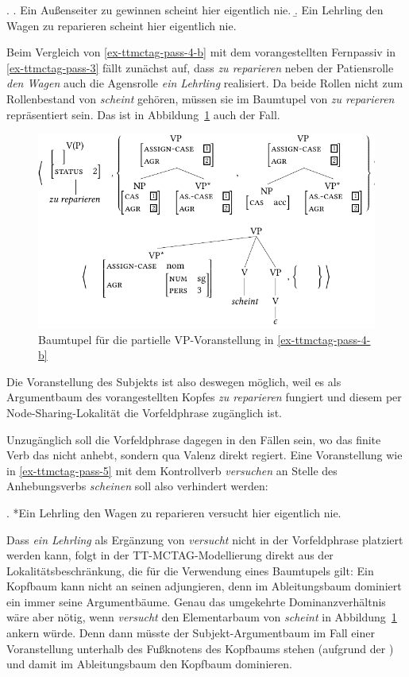 \ex. \label{ex-ttmctag-pass-4} 
\a. \label{ex-ttmctag-pass-4-a} Ein Au\ss enseiter zu gewinnen scheint hier eigentlich nie. \hfill \cite[(265)]{Meurers:99}
\b. \label{ex-ttmctag-pass-4-b} Ein Lehrling den Wagen zu reparieren scheint hier eigentlich nie.

Beim Vergleich von \ref{ex-ttmctag-pass-4-b} mit dem vorangestellten Fernpassiv in \ref{ex-ttmctag-pass-3} fällt zunächst auf, dass {\it zu reparieren} neben der Patiensrolle {\it den Wagen} auch die Agensrolle {\it ein Lehrling} realisiert. Da beide Rollen nicht zum Rollenbestand von {\it scheint} gehören, müssen sie im Baumtupel von {\it zu reparieren} repräsentiert sein. Das ist in Abbildung~\ref{fig-ttmctag-fern-4} auch der Fall.
\begin{figure}[t]
\centering
\includegraphics{graphics/abb725.pdf}
\caption{\label{fig-ttmctag-fern-4}Baumtupel für die partielle VP-Voranstellung in \ref{ex-ttmctag-pass-4-b}}
\end{figure}
Die Voranstellung des Subjekts ist also deswegen möglich, weil es als Argumentbaum des vorangestellten Kopfes {\it zu reparieren} fungiert und diesem per Node-Sharing-Lokalität die Vorfeldphrase zugänglich ist.

Unzugänglich soll die Vorfeldphrase dagegen in den Fällen sein, wo das finite Verb das  nicht anhebt, sondern qua Valenz direkt regiert. Eine Voranstellung wie in \ref{ex-ttmctag-pass-5} mit dem Kontrollverb {\it versuchen} an Stelle des Anhebungsverbs {\it scheinen} soll also verhindert werden:  

\ex. \label{ex-ttmctag-pass-5} *Ein Lehrling den Wagen zu reparieren versucht hier eigentlich nie.

Dass {\it ein Lehrling} als Ergänzung von {\it versucht} nicht in der Vorfeldphrase platziert werden kann, folgt in der TT-MCTAG-Modellierung direkt aus der Lokalitätsbeschränkung, die für die Verwendung eines Baumtupels gilt: Ein Kopfbaum kann nicht an seinen  adjungieren, denn im Ableitungsbaum dominiert ein  immer seine Argumentbäume.  Genau das umgekehrte Dominanzverhältnis wäre aber nötig, wenn \textit{versucht} den Elementarbaum von \textit{scheint} in Abbildung~\ref{fig-ttmctag-fern-4} ankern würde. Denn dann müsste der Subjekt-Argumentbaum im Fall einer Voranstellung unterhalb des Fu\ss knotens des Kopfbaums stehen (aufgrund der ) und damit im Ableitungsbaum den Kopfbaum dominieren.\\

